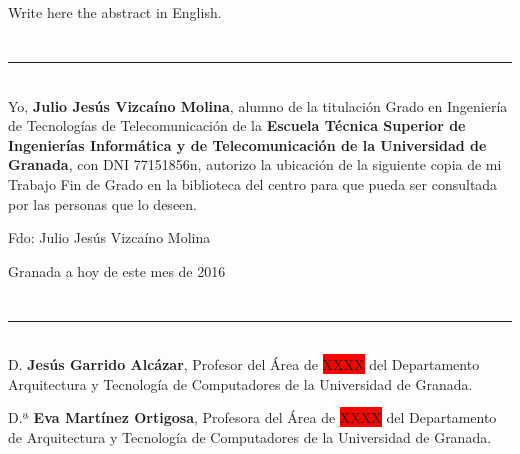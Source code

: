 \\

\vspace{0.7cm}
\\

Write here the abstract in English.

\chapter*{}
\thispagestyle{empty}

\noindent\rule[-1ex]{\textwidth}{2pt}\\[4.5ex]

Yo, \textbf{Julio Jesús Vizcaíno Molina}, alumno de la titulación Grado en Ingeniería de Tecnologías de Telecomunicación de la \textbf{Escuela Técnica Superior de Ingenierías Informática y de Telecomunicación de la Universidad de Granada}, con DNI 77151856n, autorizo la ubicación de la siguiente copia de mi Trabajo Fin de Grado en la biblioteca del centro para que pueda ser consultada por las personas que lo deseen.

\vspace{6cm}

\noindent Fdo: Julio Jesús Vizcaíno Molina

\vspace{2cm}

\begin{flushright}
Granada a hoy de este mes de 2016
\end{flushright}


\chapter*{}
\thispagestyle{empty}

\noindent\rule[-1ex]{\textwidth}{2pt}\\[4.5ex]

D. \textbf{Jesús Garrido Alcázar}, Profesor del Área de \colorbox{red}{XXXX} del Departamento Arquitectura y Tecnología de Computadores de la Universidad de Granada.

\vspace{0.5cm}

D.ª \textbf{Eva Martínez Ortigosa}, Profesora del Área de \colorbox{red}{XXXX} del Departamento de Arquitectura y Tecnología de Computadores de la Universidad de Granada.


